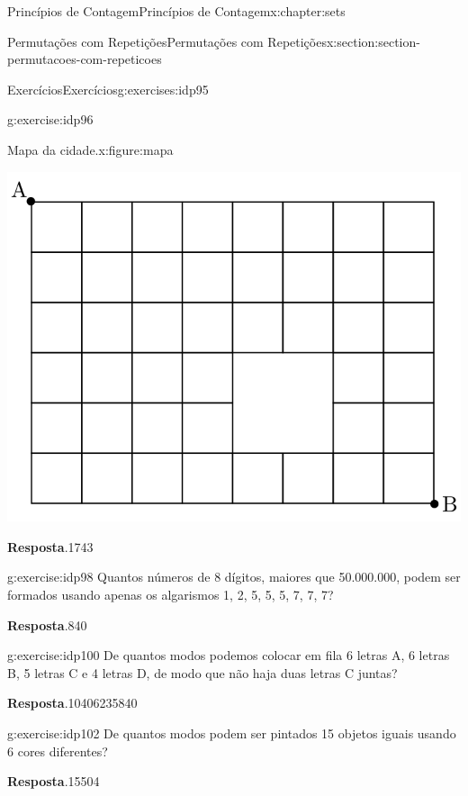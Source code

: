 \documentclass[oneside,10pt,]{book}
\newcommand{\blocktitlefont}{\relax}
\numberwithin{equation}{section}
\begin{document}
\begin{chapterptx}{Princípios de Contagem}{}{Princípios de Contagem}{}{}{x:chapter:sets}
\begin{sectionptx}{Permutações com Repetições}{}{Permutações com Repetições}{}{}{x:section:section-permutacoes-com-repeticoes}
\begin{exercises-subsection}{Exercícios}{}{Exercícios}{}{}{g:exercises:idp95}
\begin{divisionexercise}{1}{}{}{g:exercise:idp96}
\begin{figureptx}{Mapa da cidade.}{x:figure:mapa}{}
\begin{image}{0.275}{0.45}{0.275}%
\includegraphics[width=\linewidth]{images/permut}
\end{image}%
\tcblower
\end{figureptx}%
\par\smallskip%
\noindent\textbf{\blocktitlefont Resposta}.\hypertarget{g:answer:idp97}{}\quad{}1743%
\end{divisionexercise}%
\begin{divisionexercise}{2}{}{}{g:exercise:idp98}%
Quantos números de 8 dígitos, maiores que 50.000.000, podem ser formados usando apenas os algarismos 1, 2, 5, 5, 5, 7, 7, 7?%
\par\smallskip%
\noindent\textbf{\blocktitlefont Resposta}.\hypertarget{g:answer:idp99}{}\quad{}840%
\end{divisionexercise}%
\begin{divisionexercise}{3}{}{}{g:exercise:idp100}%
De quantos modos podemos colocar em fila 6 letras A, 6 letras B, 5 letras C e 4 letras D, de modo que não haja duas letras C juntas?%
\par\smallskip%
\noindent\textbf{\blocktitlefont Resposta}.\hypertarget{g:answer:idp101}{}\quad{}10406235840%
\end{divisionexercise}%
\begin{divisionexercise}{4}{}{}{g:exercise:idp102}%
De quantos modos podem ser pintados 15 objetos iguais usando 6 cores diferentes?%
\par\smallskip%
\noindent\textbf{\blocktitlefont Resposta}.\hypertarget{g:answer:idp103}{}\quad{}15504%
\end{divisionexercise}%

\end{exercises-subsection}
\end{sectionptx}
\end{chapterptx}
\end{document}
